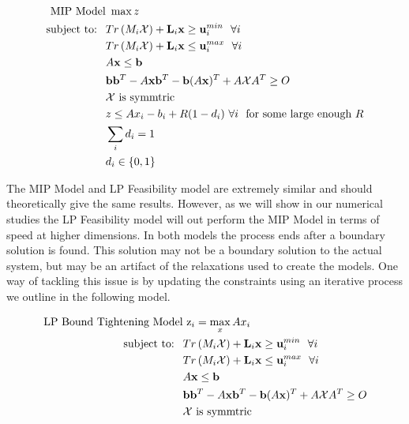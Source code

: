 \begin{subequations}\label{eq:OPTfeasrelaxLP2}
\begin{align}
 \text{MIP Model}& \ \max z  \\
 \text{subject to: } \ &Tr\left(M_i\mathcal{X}\right)+\bold L_i\bold x \geq \bold u_i^{min}  \ \ \forall i\\
 & Tr\left(M_i\mathcal{X}\right)+\bold L_i\bold x \leq \bold u_i^{max}  \ \ \forall i\\
 	&A\bold x\leq \bold b \\
 	&\bold b\bold b^T-A\bold x\bold b^T-\bold b(A\bold x)^T+A\mathcal{X}A^T\geq O \\
 	&\mathcal{X} \text{ is symmtric} \\
 	& z\leq Ax_i-b_i+R(1-d_i) \ \forall i \ \text{ for some large enough $R$} \\
 	& \sum\limits_i d_i=1 \\
 	& d_i\in\{0,1\}
\end{align}
\end{subequations}

The MIP Model and LP Feasibility model are extremely similar and should theoretically give the same results. 
However, as we will show in our numerical studies the LP Feasibility model will out perform the MIP Model in terms of speed at higher dimensions. 
In both models the process ends after a boundary solution is found. 
This solution may not be a boundary solution to the actual system, but may be an artifact of the relaxations used to create the models. 
One way of tackling this issue is by updating the constraints using an iterative process we outline in the following model.
 
\begin{subequations}\label{eq:OPTfeasrelaxLP3}
\begin{align}
\text{LP Bound Tightening Model}& \ \mathrm{z}_{i} = \max_x Ax_i  \\
 \text{subject to: } \ &Tr\left(M_i\mathcal{X}\right)+\bold L_i\bold x \geq \bold u_i^{min}  \ \ \forall i\\
 & Tr\left(M_i\mathcal{X}\right)+\bold L_i\bold x \leq \bold u_i^{max}  \ \ \forall i\\
 	&A\bold x\leq \bold b \\
 	&\bold b\bold b^T-A\bold x\bold b^T-\bold b(A\bold x)^T+A\mathcal{X}A^T\geq O \\
 	&\mathcal{X} \text{ is symmtric}
\end{align}
\end{subequations}

